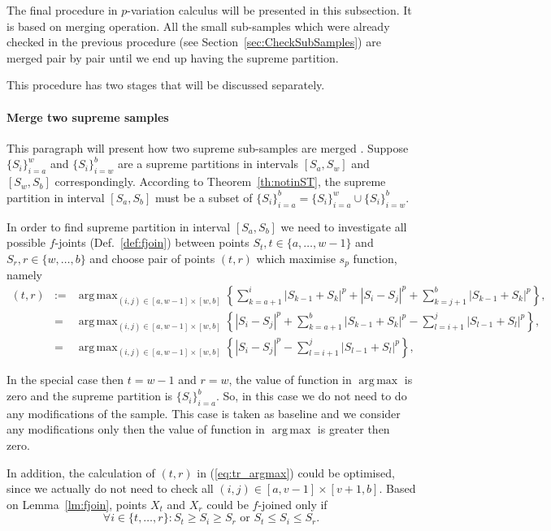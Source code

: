 \documentclass[12pt, a4paper]{article}
\DeclareMathOperator*{\argmax}{arg\,max}
\numberwithin{equation}{section}
\begin{document}
The final procedure in $p$-variation calculus will be
presented in this subsection. It is based on
merging operation. 
All the small sub-samples which were 
already checked in the 
previous procedure 
(see Section~\ref{sec:CheckSubSamples}) 
are merged pair by pair until  we end up having
the supreme partition.

This procedure has two stages that will be discussed separately.

\paragraph{Merge two supreme samples}

This paragraph will present how two supreme
sub-samples are merged .
Suppose $\{S_{i}\}_{i=a}^{w}$  and $\{S_{i}\}_{i=w}^{b}$
are a supreme partitions in intervals $[S_a,S_w]$ and $[S_w,S_b]$ correspondingly. 
According to Theorem~\ref{th:notinST},
the supreme partition in interval $[S_a, S_b]$ 
must be a subset of 
$\{S_{i}\}_{i=a}^{b} = \{S_{i}\}_{i=a}^{w} \cup \{S_{i}\}_{i=w}^{b}$.
 
In order to find supreme partition in interval $[S_a,S_b]$
we need to investigate all possible
$f$-joints (Def.~\ref{def:fjoin}) between points $S_t, t\in \{a,\dots,w-1\}$ and
$S_r, r\in \{w,\dots,b\}$ and choose pair of points
$(t, r)$ which maximise $s_p$ function, namely  
\begin{eqnarray}
  (t, r) &:=& \argmax_{(i,j) \in [a, w-1] \times [w, b] } 
    \left\{ \sum_{k=a+1}^i |S_{k-1} + S_{k}|^p + |S_i-S_j|^p 
    + \sum_{k=j+1}^b |S_{k-1} + S_{k}|^p \right\}, \nonumber \\
  &=& \argmax_{(i,j) \in [a, w-1] \times [w, b] }  
    \left\{|S_i-S_j|^p +  \sum_{k=a+1}^b |S_{k-1} + S_{k}|^p  
    - \sum_{l=i+1}^j |S_{l-1} + S_{l}|^p  \right\}, \nonumber \\
   \label{eq:tr_argmax}  
   &=& \argmax_{(i,j) \in [a, w-1] \times [w, b] }  
    \left\{|S_i-S_j|^p - \sum_{l=i+1}^j |S_{l-1} + S_{l}|^p  \right\},   
\end{eqnarray}

In the special case then $t=w-1$ and $r=w$, the value 
of function in $\argmax$ is zero and the supreme
partition is $\{S_{i}\}_{i=a}^{b}$. 
So, in this case we do not 
need to do any modifications of the sample. 
This case is taken as baseline and we consider 
any modifications only then the value of function
in $\argmax$ is greater then zero.

In addition, the calculation of $(t, r)$ in (\ref{eq:tr_argmax})
could be optimised, since we actually do not need to check
all $(i,j) \in [a, v-1] \times [v+1, b]$. 
Based on Lemma~\ref{lm:fjoin},
points $X_t$ and $X_r$ could be $f$-joined only if 
\begin{equation}
  \forall i \in \{t,\dots,r\}: S_t \geq S_i \geq S_r \text{ or } 
  S_t \leq S_i \leq S_r.
\end{equation} 
   
\end{document}
